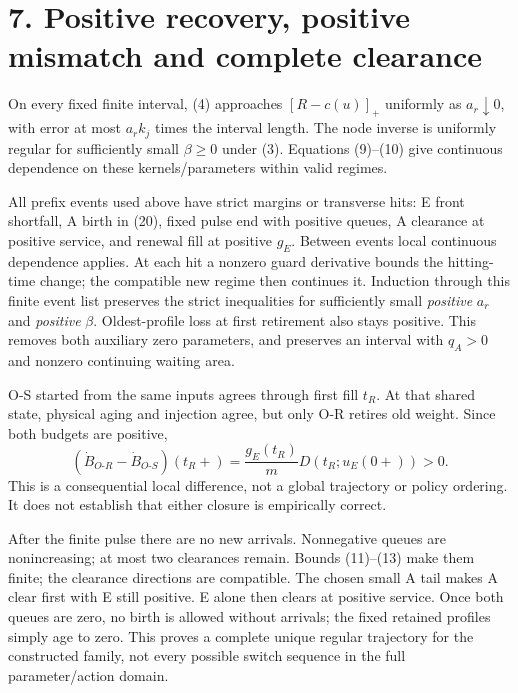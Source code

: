 \documentclass[11pt,a4paper]{article}
\newcommand{\pos}[1]{[#1]_+}
\begin{document}
\newpage
\section*{7. Positive recovery, positive mismatch and complete clearance}

On every fixed finite interval, (4) approaches $\pos{R-c(u)}$ uniformly
as $a_r\downarrow0$, with error at most $a_rk_j$ times the interval
length. The node inverse is uniformly regular for sufficiently small
$\beta\geq0$ under (3). Equations (9)--(10) give continuous dependence
on these kernels/parameters within valid regimes.

All prefix events used above have strict margins or transverse hits:
E front shortfall, A birth in (20), fixed pulse end with positive queues,
A clearance at positive service, and renewal fill at positive $g_E$.
Between events local continuous dependence applies. At each hit a nonzero
guard derivative bounds the hitting-time change; the compatible new regime
then continues it. Induction through this finite event list preserves
the strict inequalities for sufficiently small \emph{positive} $a_r$ and
\emph{positive} $\beta$. Oldest-profile loss at first retirement also stays
positive. This removes both auxiliary zero parameters, and preserves an
interval with $q_A>0$ and nonzero continuing waiting area.

O-S started from the same inputs agrees through first fill $t_R$. At that
shared state, physical aging and injection agree, but only O-R retires old
weight. Since both budgets are positive,
\begin{equation}
 (\dot B_{O\text{-}R}-\dot B_{O\text{-}S})(t_R+)
   =\frac{g_E(t_R)}mD(t_R;u_E(0+))>0. \tag{23a}
\end{equation}
This is a consequential local difference, not a global trajectory or policy
ordering. It does not establish that either closure is empirically correct.

After the finite pulse there are no new arrivals. Nonnegative queues are
nonincreasing; at most two clearances remain. Bounds (11)--(13) make them
finite; the clearance directions are compatible. The chosen small A tail
makes A clear first with E still positive. E alone then clears at positive
service. Once both queues are zero, no birth is allowed without arrivals;
the fixed retained profiles simply age to zero. This proves a complete
unique regular trajectory for the constructed family, not every possible
switch sequence in the full parameter/action domain.
\end{document}
